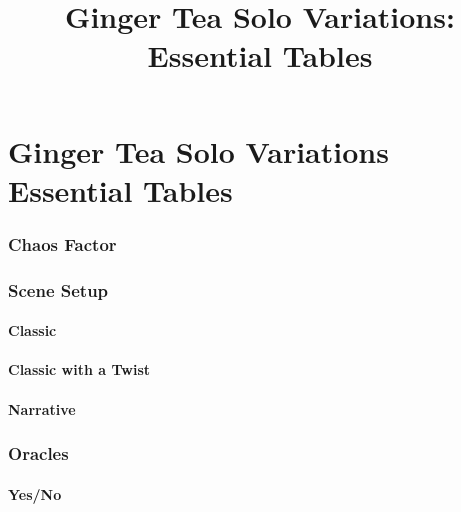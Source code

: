 

\title{Ginger Tea Solo Variations: Essential Tables}


\mainmatter
\chapter*{Ginger Tea Solo Variations\hspace*{8cm} Essential Tables \version}
\subsection{Chaos Factor}


\subsection{Scene Setup}
\subsubsection{Classic}

\subsubsection{Classic with a Twist}

\subsubsection{Narrative}


\newpage
\subsection{Oracles}
\subsubsection{Yes/No}



